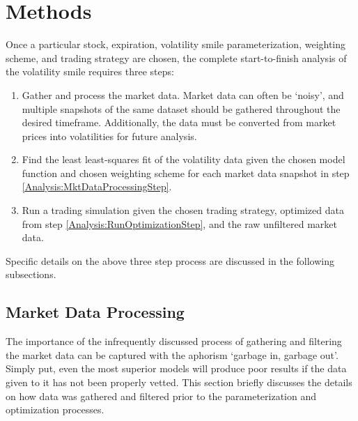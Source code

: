 \documentclass[12pt, a4paper, notitlepage]{article}
\numberwithin{equation}{subsection}
\numberwithin{figure}{subsection}
\numberwithin{table}{subsection}
\begin{document}
\section{Methods}
Once a particular stock, expiration, volatility smile parameterization, weighting scheme, and trading strategy are chosen, the complete start-to-finish analysis of the volatility smile requires three steps:
\begin{enumerate}
	\item Gather and process the market data.  Market data can often be `noisy', and multiple snapshots of the same dataset should be gathered throughout the desired timeframe.  Additionally, the data must be converted from market prices into volatilities for future analysis.\label{Analysis:MktDataProcessingStep}
    \item Find the least least-squares fit of the volatility data given the chosen model function and chosen weighting scheme for each market data snapshot in step \ref{Analysis:MktDataProcessingStep}. \label{Analysis:RunOptimizationStep}
    \item Run a trading simulation given the chosen trading strategy, optimized data from step \ref{Analysis:RunOptimizationStep}, and the raw unfiltered market data.
\end{enumerate}
Specific details on the above three step process are discussed in the following subsections.

\subsection{Market Data Processing}
\label{subsec:MarketDataProcessing}
The importance of the infrequently discussed process of gathering and filtering the market data can be captured with the aphorism `garbage in, garbage out'.  Simply put, even the most superior models will produce poor results if the data given to it has not been properly vetted.  This section briefly discusses the details on how data was gathered and filtered prior to the parameterization and optimization processes.
\end{document}

